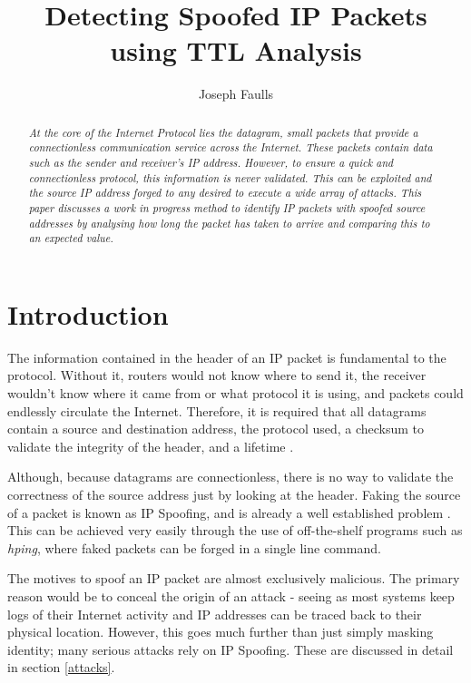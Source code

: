 \documentclass[twocolumn,10pt]{asme2ej}
\title{Detecting Spoofed IP Packets using TTL Analysis}
\author{Joseph Faulls
    \affiliation{
	MSci Computer Science\\
    Email: jxf438@student.bham.ac.uk
    }	
}
\begin{document}
\maketitle    

\begin{abstract}
{\it At the core of the Internet Protocol lies the datagram, small packets that provide a connectionless communication service across the Internet. These packets contain data such as the sender and receiver's IP address. However, to ensure a quick and connectionless protocol, this information is never validated. This can be exploited and the source IP address forged to any desired to execute a wide array of attacks. This paper discusses a work in progress method to identify IP packets with spoofed source addresses by analysing how long the packet has taken to arrive and comparing this to an expected value. 
}
\end{abstract}

\section{Introduction}
The information contained in the header of an IP packet is fundamental to the protocol. Without it, routers would not know where to send it, the receiver wouldn't know where it came from or what protocol it is using, and packets could endlessly circulate the Internet. Therefore, it is required that all datagrams contain a source and destination address, the protocol used, a checksum to validate the integrity of the header, and a lifetime \cite{rfc791}.

Although, because datagrams are connectionless, there is no way to validate the correctness of the source address just by looking at the header. Faking the source of a packet is known as IP Spoofing, and is already a well established problem \cite{ipSpoofIntro} \cite{ipSpoofing} \cite{spoofProblemStatement}. This can be achieved very easily through the use of off-the-shelf programs such as {\it hping}\cite{hping}, where faked packets can be forged in a single line command.

The motives to spoof an IP packet are almost exclusively malicious. The primary reason would be to conceal the origin of an attack - seeing as most systems keep logs of their Internet activity and IP addresses can be traced back to their physical location. However, this goes much further than just simply masking identity; many serious attacks rely on IP Spoofing. These are discussed in detail in section \ref{attacks}.
\end{document}
